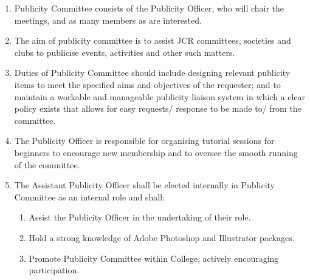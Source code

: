 \begin{enumerate}
    \item Publicity Committee consists of the Publicity Officer, who will chair the meetings, and as many members as are interested.
    \item The aim of publicity committee is to assist JCR committees, societies and clubs to publicise events, activities and other such matters.
    \item Duties of Publicity Committee should include designing relevant publicity items to meet the specified aims and objectives of the requester; and to maintain a workable and manageable publicity liaison system in which a clear policy exists that allows for easy requests/ response to be made to/ from the committee.
    \item The Publicity Officer is responsible for organising tutorial sessions for beginners to encourage new membership and to oversee the smooth running of the committee.
    \item The Assistant Publicity Officer shall be elected internally in Publicity Committee as an internal role
    and shall:
    \begin{enumerate}
        \item Assist the Publicity Officer in the undertaking of their role.
        \item Hold a strong knowledge of Adobe Photoshop and Illustrator packages. 
        \item Promote Publicity Committee within College, actively encouraging participation.
    \end{enumerate}
\end{enumerate}


